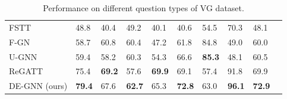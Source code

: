 \documentclass[letterpaper]{article} %
\begin{document}
\begin{table}[ht]
\begin{tabular}{l|lllllllll}
     FSTT~\cite{inproceedings} &48.8 &40.4 &49.2 &40.1 &40.6 &54.5 &70.3 &48.1\\
     F-GN~\cite{DBLP:conf/bmvc/ZhangCX19} &58.7 &60.8 &60.4 &47.2 &61.8 &84.8 &49.0 &60.0\\
     U-GNN~\cite{DBLP:conf/bmvc/ZhangCX19} &59.4 &58.2 &60.3 &54.3 &66.6 &\textbf{85.3} &48.1 &60.5\\
     ReGATT~\cite{DBLP:conf/iccv/LiGCL19} &75.4 &\textbf{69.2} &57.6 &\textbf{69.9} &69.1 &57.4 &91.8 &69.9\\
     DE-GNN (ours) &\textbf{79.4} &67.6 &\textbf{62.7} &65.3 &\textbf{72.8} &63.0 &\textbf{96.1} &\textbf{72.9}\\
    \hline
    \end{tabular}
\caption{\label{VG-detail}
Performance on different question types of VG dataset.}
\end{table}
\end{document}
